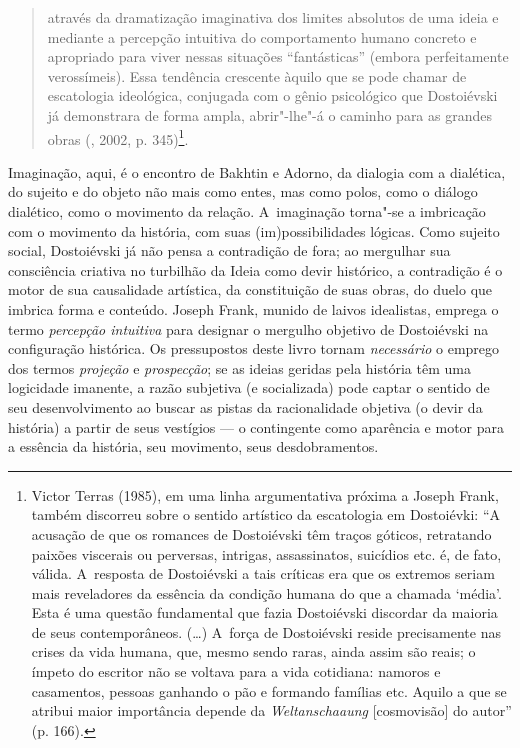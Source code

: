 \begin{quote}
através da dramatização imaginativa dos limites absolutos de uma ideia e
mediante a percepção intuitiva do comportamento humano concreto e
apropriado para viver nessas situações ``fantásticas'' (embora
perfeitamente verossímeis). Essa tendência crescente àquilo que se pode
chamar de escatologia ideológica, conjugada com o gênio psicológico que
Dostoiévski já demonstrara de forma ampla, abrir"-lhe"-á o caminho para as
grandes obras (, 2002, p. 345)\footnote{Victor Terras (1985), em
  uma linha argumentativa próxima a Joseph Frank, também discorreu sobre
  o sentido artístico da escatologia em Dostoiévki: ``A acusação de que
  os romances de Dostoiévski têm traços góticos, retratando paixões
  viscerais ou perversas, intrigas, assassinatos, suicídios etc. é, de
  fato, válida. A~resposta de Dostoiévski a tais críticas era que os
  extremos seriam mais reveladores da essência da condição humana do que
  a chamada `média'. Esta é uma questão fundamental que fazia
  Dostoiévski discordar da maioria de seus contemporâneos. (\ldots) A~força
  de Dostoiévski reside precisamente nas crises da vida humana, que,
  mesmo sendo raras, ainda assim são reais; o ímpeto do escritor não se
  voltava para a vida cotidiana: namoros e casamentos, pessoas ganhando
  o pão e formando famílias etc. Aquilo a que se atribui maior
  importância depende da \emph{Weltanschaaung} {[}cosmovisão{]} do
  autor'' (p. 166).}.
\end{quote}

Imaginação, aqui, é o encontro de Bakhtin e Adorno, da dialogia com a
dialética, do sujeito e do objeto não mais como entes, mas como polos,
como o diálogo dialético, como o movimento da relação. A~imaginação
torna"-se a imbricação com o movimento da história, com suas
(im)possibilidades lógicas. Como sujeito social, Dostoiévski já não
pensa a contradição de fora; ao mergulhar sua consciência criativa no
turbilhão da Ideia como devir histórico, a contradição é o motor de sua
causalidade artística, da constituição de suas obras, do duelo que
imbrica forma e conteúdo. Joseph Frank, munido de laivos idealistas,
emprega o termo \emph{percepção intuitiva} para designar o mergulho
objetivo de Dostoiévski na configuração histórica. Os pressupostos deste
livro tornam \emph{necessário} o emprego dos termos \emph{projeção} e
\emph{prospecção}; se as ideias geridas pela história têm uma logicidade
imanente, a razão subjetiva (e socializada) pode captar o sentido de seu
desenvolvimento ao buscar as pistas da racionalidade objetiva (o devir
da história) a partir de seus vestígios --- o contingente como aparência
e motor para a essência da história, seu movimento, seus desdobramentos.

